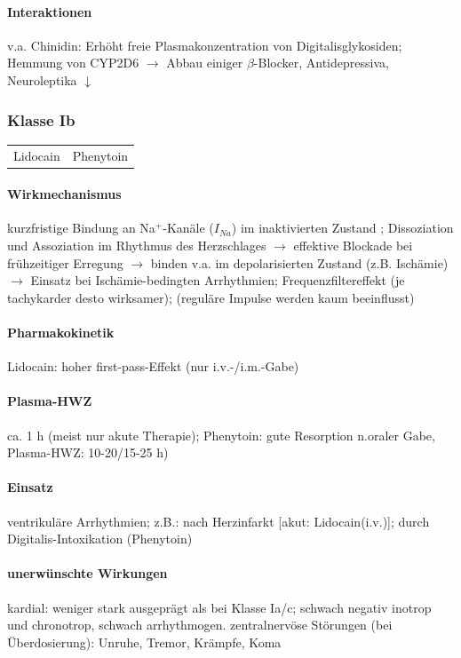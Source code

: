 \documentclass[10pt,a4paper]{report}
\begin{document}
\paragraph{Interaktionen} v.a. Chinidin: Erhöht freie Plasmakonzentration von Digitalisglykosiden; Hemmung von CYP2D6 $\rightarrow$ Abbau einiger $\beta$-Blocker, Antidepressiva, Neuroleptika $\downarrow$

\subsubsection{Klasse Ib}
\begin{tabularx}{\textwidth}{XX}
Lidocain&Phenytoin\\	 
\end{tabularx}

\paragraph{Wirkmechanismus} kurzfristige Bindung an Na$^+$-Kanäle ($I_{Na}$) im inaktivierten Zustand ; Dissoziation und Assoziation im Rhythmus des Herzschlages
	$\rightarrow$ 	effektive Blockade bei frühzeitiger Erregung
	$\rightarrow$ 	binden v.a. im depolarisierten Zustand (z.B. Ischämie) $\rightarrow$ Einsatz bei 	Ischämie-bedingten Arrhythmien; Frequenzfiltereffekt (je tachykarder desto wirksamer); (reguläre Impulse werden kaum beeinflusst)

\paragraph{Pharmakokinetik} Lidocain: hoher first-pass-Effekt (nur i.v.-/i.m.-Gabe)

\paragraph{Plasma-HWZ} ca. 1 h (meist nur akute Therapie); Phenytoin: gute Resorption n.oraler Gabe, Plasma-HWZ: 10-20/15-25 h)

\paragraph{Einsatz}	 ventrikuläre Arrhythmien; z.B.: nach Herzinfarkt [akut: Lidocain(i.v.)]; durch Digitalis-Intoxikation (Phenytoin)	

\paragraph{unerwünschte Wirkungen} kardial: weniger stark ausgeprägt als bei Klasse Ia/c; schwach negativ inotrop und chronotrop, schwach arrhythmogen. zentralnervöse Störungen (bei Überdosierung): Unruhe, Tremor, Krämpfe, Koma
\end{document}

